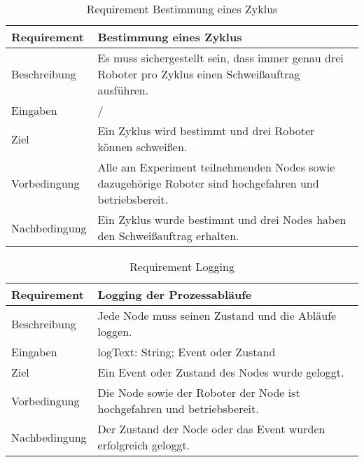 \begin{table}[h!]
\begin{center}
\begin{tabular}{ |p{2.5cm}|p{11cm}| } 
 \hline
 Requirement & Bestimmung eines Zyklus \\
 \hline
 Beschreibung & Es muss sichergestellt sein, dass immer genau drei Roboter pro Zyklus einen
 Schweißauftrag ausführen. \\
 \hline
 Eingaben & / \\
 \hline
 Ziel & Ein Zyklus wird bestimmt und drei Roboter können schweißen. \\
 \hline
 Vorbedingung & Alle am Experiment teilnehmenden Nodes sowie dazugehörige Roboter sind
 hochgefahren und betriebsbereit. \\
 \hline
 Nachbedingung & Ein Zyklus wurde bestimmt und drei Nodes haben den Schweißauftrag erhalten. \\
 \hline
\end{tabular}
\caption{Requirement Bestimmung eines Zyklus}
\label{table:3}
\end{center}
\end{table}

\begin{table}[h!]
\begin{center}
\begin{tabular}{ |p{2.5cm}|p{11cm}| } 
 \hline
 Requirement & Logging der Prozessabläufe \\
 \hline
 Beschreibung & Jede Node muss seinen Zustand und die Abläufe loggen. \\
 \hline
 Eingaben & logText: String; Event oder Zustand \\
 \hline
 Ziel & Ein Event oder Zustand des Nodes wurde geloggt. \\
 \hline
 Vorbedingung & Die Node sowie der Roboter der Node ist hochgefahren und betriebsbereit. \\
 \hline
 Nachbedingung & Der Zustand der Node oder das Event wurden erfolgreich geloggt. \\
 \hline
\end{tabular}
\caption{Requirement Logging}
\label{table:4}
\end{center}
\end{table}

